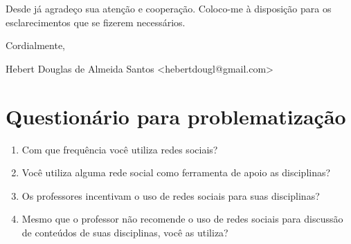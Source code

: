 \begin{apendicesenv}
Desde já agradeço sua atenção e cooperação. Coloco-me à disposição para os esclarecimentos que se fizerem necessários.

Cordialmente,
\begin{description}
\item Hebert Douglas de Almeida Santos <hebertdougl@gmail.com>
\end{description}

\chapter{Questionário para problematização}
\label{apen-quest}

\begin{enumerate}

\item \label{pergunta1} Com que frequência você utiliza redes sociais?

\item \label{pergunta2} Você utiliza alguma rede social como ferramenta de apoio as disciplinas?

\item \label{pergunta3} Os professores incentivam o uso de redes sociais para suas disciplinas?

\item \label{pergunta4} Mesmo que o professor não recomende o uso de redes sociais para discussão de conteúdos de suas disciplinas, você as utiliza?

\end{enumerate}

\end{apendicesenv}